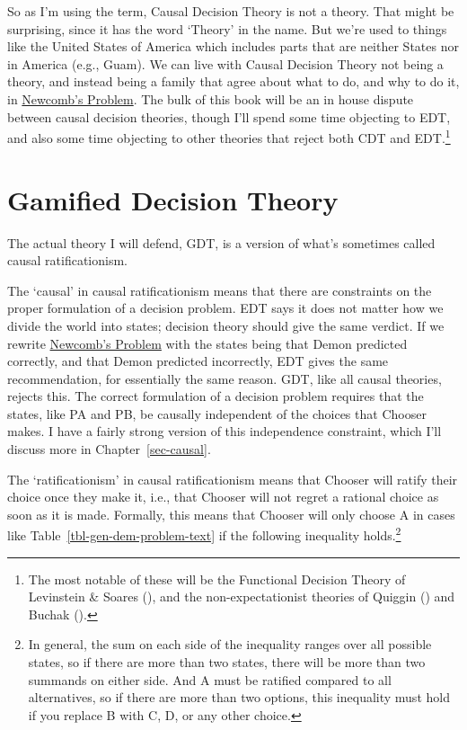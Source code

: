\documentclass[
  12pt,
  letterpaper,
  DIV=11,
  numbers=noendperiod]{scrreprt}
\begin{document}
So as I'm using the term, Causal Decision Theory is not a theory. That
might be surprising, since it has the word `Theory' in the name. But
we're used to things like the United States of America which includes
parts that are neither States nor in America (e.g., Guam). We can live
with Causal Decision Theory not being a theory, and instead being a
family that agree about what to do, and why to do it, in
\hyperref[tbl-newcomb]{Newcomb's Problem}. The bulk of this book will be
an in house dispute between causal decision theories, though I'll spend
some time objecting to EDT, and also some time objecting to other
theories that reject both CDT and EDT.\footnote{The most notable of
  these will be the Functional Decision Theory of Levinstein \& Soares
  (), and the
  non-expectationist theories of Quiggin
  () and Buchak
  ().}

\section{Gamified Decision Theory}\label{sec-gdt-defined}

The actual theory I will defend, GDT, is a version of what's sometimes
called causal ratificationism.

The `causal' in causal ratificationism means that there are constraints
on the proper formulation of a decision problem. EDT says it does not
matter how we divide the world into states; decision theory should give
the same verdict. If we rewrite \hyperref[tbl-newcomb]{Newcomb's
Problem} with the states being that Demon predicted correctly, and that
Demon predicted incorrectly, EDT gives the same recommendation, for
essentially the same reason. GDT, like all causal theories, rejects
this. The correct formulation of a decision problem requires that the
states, like PA and PB, be causally independent of the choices that
Chooser makes. I have a fairly strong version of this independence
constraint, which I'll discuss more in Chapter~\ref{sec-causal}.

The `ratificationism' in causal ratificationism means that Chooser will
ratify their choice once they make it, i.e., that Chooser will not
regret a rational choice as soon as it is made. Formally, this means
that Chooser will only choose A in cases like
Table~\ref{tbl-gen-dem-problem-text} if the following inequality
holds.\footnote{In general, the sum on each side of the inequality
  ranges over all possible states, so if there are more than two states,
  there will be more than two summands on either side. And A must be
  ratified compared to all alternatives, so if there are more than two
  options, this inequality must hold if you replace B with C, D, or any
  other choice.}
\end{document}
